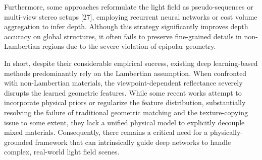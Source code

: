 Furthermore, some approaches reformulate the light field as pseudo-sequences or multi-view stereo setups [27], employing recurrent neural networks or cost volume aggregation to infer depth. Although this strategy significantly improves depth accuracy on global structures, it often fails to preserve fine-grained details in non-Lambertian regions due to the severe violation of epipolar geometry.

In short, despite their considerable empirical success, existing deep learning-based methods predominantly rely on the Lambertian assumption. When confronted with non-Lambertian materials, the viewpoint-dependent reflectance severely disrupts the learned geometric features. While some recent works attempt to incorporate physical priors or regularize the feature distribution, substantially resolving the failure of traditional geometric matching and the texture-copying issue to some extent, they lack a unified physical model to explicitly decouple mixed materials. Consequently, there remains a critical need for a physically-grounded framework that can intrinsically guide deep networks to handle complex, real-world light field scenes.